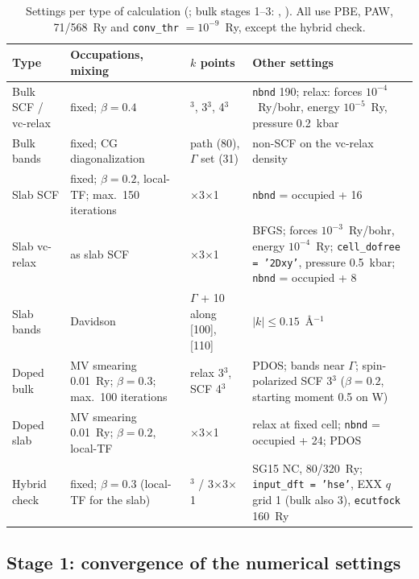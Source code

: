 \begin{table}[htbp]\centering\footnotesize
\caption{Settings per type of calculation (; bulk stages 1--3: ,
). All use PBE, PAW, 71/568~Ry and \texttt{conv\_thr} $= 10^{-9}$~Ry, except the hybrid check.}
\label{tab:dft-settings}
\begin{tabularx}{\linewidth}{@{}>{\raggedright\arraybackslash}p{2.5cm}>{\raggedright\arraybackslash}X>{\raggedright\arraybackslash}p{2.0cm}>{\raggedright\arraybackslash}p{4.4cm}@{}}
\toprule
Type & Occupations, mixing & $k$ points & Other settings \\
\midrule
Bulk SCF / vc-relax & fixed; $\beta = 0.4$ & 2$^3$, 3$^3$, 4$^3$ & \texttt{nbnd} 190; relax: forces $10^{-4}$~Ry/bohr, energy $10^{-5}$~Ry, pressure 0.2~kbar \\
Bulk bands & fixed; CG diagonalization & path (80), $\Gamma$ set (31) & non-SCF on the vc-relax density \\
Slab SCF & fixed; $\beta = 0.2$, local-TF; max.\ 150 iterations & 3$\times$3$\times$1 & \texttt{nbnd} = occupied + 16 \\
Slab vc-relax & as slab SCF & 3$\times$3$\times$1 & BFGS; forces $10^{-3}$~Ry/bohr, energy $10^{-4}$~Ry; \texttt{cell\_dofree = '2Dxy'}, pressure 0.5~kbar; \texttt{nbnd} = occupied + 8 \\
Slab bands & Davidson & $\Gamma$ + 10 along [100], [110] & $|k| \le 0.15$~\AA$^{-1}$ \\
Doped bulk & MV smearing 0.01~Ry; $\beta = 0.3$; max.\ 100 iterations & relax 3$^3$, SCF 4$^3$ & PDOS; bands near $\Gamma$; spin-polarized SCF 3$^3$ ($\beta = 0.2$, starting moment 0.5 on W) \\
Doped slab & MV smearing 0.01~Ry; $\beta = 0.2$, local-TF & 3$\times$3$\times$1 & relax at fixed cell; \texttt{nbnd} = occupied + 24; PDOS \\
Hybrid check & fixed; $\beta = 0.3$ (local-TF for the slab) & 3$^3$ / 3$\times$3$\times$1 & SG15 NC, 80/320~Ry; \texttt{input\_dft = 'hse'}, EXX $q$ grid 1 (bulk also 3), \texttt{ecutfock} 160~Ry \\
\bottomrule
\end{tabularx}
\end{table}

\subsection{Stage 1: convergence of the numerical settings}
\label{sec:dft-calc-conv}

